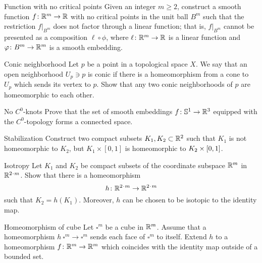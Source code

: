 \documentclass[twoside]{book}
\begin{document}
{\begin{pr}{}{Function with no critical points}\label{Function with no critical points}
Given an integer $m\ge 2$, 
construct a smooth function $f\colon\mathbb{R}^m\to \mathbb{R}$ 
with no critical points in the unit ball $B^m$ 
such that the restriction $f|_{B^m}$ does not factor through a linear function;
that is, 
$f|_{B^m}$ cannot be presented as a composition
$\ell\circ\phi$,
where $\ell\colon\mathbb{R}^m\to\mathbb{R}$ is a linear function 
and $\varphi\colon B^m\to\mathbb{R}^m$ is a smooth embedding.
\end{pr}

\begin{pr}{}{Conic neighborhood}\label{Conic neighborhood}  
Let $p$ be a point in a topological space $X$.
We say that an open neighborhood $U_p\ni p$ is conic
if there is a homeomorphism from a cone
to $U_p$ which sends its vertex to $p$.
Show that any two conic neighborhoods of $p$ are homeomorphic to each other.
\end{pr}

\begin{pr}{}{No $C^0$-knots}\label{No knots}
Prove that the set of smooth embeddings $f\:\mathbb{S}^1\z\to\RR^3$ equipped with the $C^0$-topology 
forms a connected space.
\end{pr}

\begin{pr}{}{Stabilization}\label{Simple stabilization}
Construct two compact subsets $K_1, K_2\subset\mathbb{R}^2$ such that
$K_1$ is not homeomorphic to $K_2$, but $K_1\times[0,1]$ is homeomorphic to $K_2\z\times[0,1]$.
\end{pr}

\begin{pr}{}{Isotropy}\label{Isotropy}
Let $K_1$ and $K_2$ be compact subsets of the coordinate subspace $\mathbb{R}^m$ in $\RR^{2\cdot m}$.
Show that there is a homeomorphism 
\[h\:\RR^{2\cdot m}\z\to \RR^{2\cdot m}\] 
such that $K_2=h(K_1)$.
Moreover, $h$ can be chosen to be isotopic to the identity map.
\end{pr}



\begin{pr}{}{Homeomorphism of cube}\label{Homeomorphism of cube}
Let $\square^m$ be a cube in $\mathbb{R}^m$.
Assume that a homeomorphism $h\:\square^m\to\square^m$ sends each face of $\square^m$ to itself.
Extend $h$ to a homeomorphism $f\colon\mathbb{R}^m\to\mathbb{R}^m$ which coincides with the identity map outside of a bounded set.    
\end{pr}


}
\end{document}
